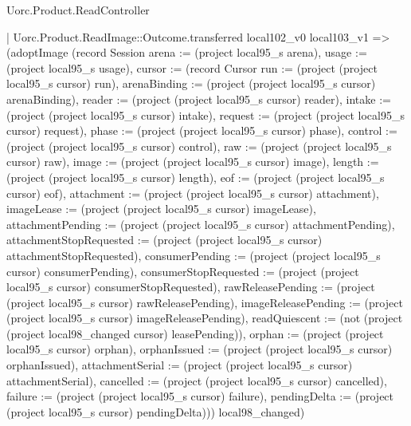 \begin{lexlean}{Uorc.Product.ReadController}
\begin{semanticmodule}
{      | Uorc.Product.ReadImage::Outcome.transferred local102_v0 local103_v1 => (adoptImage (record Session {arena := (project local95_s arena), usage := (project local95_s usage), cursor := (record Cursor {run := (project (project local95_s cursor) run), arenaBinding := (project (project local95_s cursor) arenaBinding), reader := (project (project local95_s cursor) reader), intake := (project (project local95_s cursor) intake), request := (project (project local95_s cursor) request), phase := (project (project local95_s cursor) phase), control := (project (project local95_s cursor) control), raw := (project (project local95_s cursor) raw), image := (project (project local95_s cursor) image), length := (project (project local95_s cursor) length), eof := (project (project local95_s cursor) eof), attachment := (project (project local95_s cursor) attachment), imageLease := (project (project local95_s cursor) imageLease), attachmentPending := (project (project local95_s cursor) attachmentPending), attachmentStopRequested := (project (project local95_s cursor) attachmentStopRequested), consumerPending := (project (project local95_s cursor) consumerPending), consumerStopRequested := (project (project local95_s cursor) consumerStopRequested), rawReleasePending := (project (project local95_s cursor) rawReleasePending), imageReleasePending := (project (project local95_s cursor) imageReleasePending), readQuiescent := (not (project (project local98_changed cursor) leasePending)), orphan := (project (project local95_s cursor) orphan), orphanIssued := (project (project local95_s cursor) orphanIssued), attachmentSerial := (project (project local95_s cursor) attachmentSerial), cancelled := (project (project local95_s cursor) cancelled), failure := (project (project local95_s cursor) failure), pendingDelta := (project (project local95_s cursor) pendingDelta)})}) local98_changed)
}
\end{semanticmodule}
\end{lexlean}
